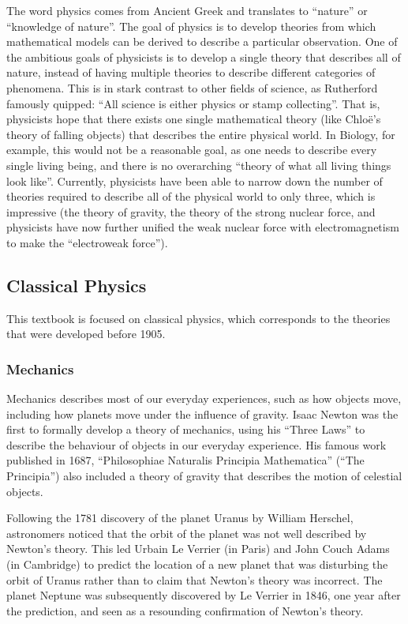 The word physics comes from Ancient Greek and translates to ``nature'' or ``knowledge of nature''. The goal of physics is to develop theories from which mathematical models can be derived to describe a particular observation. One of the ambitious goals of physicists is to develop a single theory that describes all of nature, instead of having multiple theories to describe different categories of phenomena. This is in stark contrast to other fields of science, as Rutherford famously quipped: ``All science is either physics or stamp collecting''. That is, physicists hope that there exists one single mathematical theory (like Chlo\"e's theory of falling objects) that describes the entire physical world. In Biology, for example, this would not be a reasonable goal, as one needs to describe every single living being, and there is no overarching ``theory of what all living things look like''. Currently, physicists have been able to narrow down the number of theories required to describe all of the physical world to only three, which is impressive (the theory of gravity, the theory of the strong nuclear force, and physicists have now further unified the weak nuclear force with electromagnetism to make the “electroweak force”).


\subsection{Classical Physics}
This textbook is focused on classical physics, which corresponds to the theories that were developed before 1905.
\subsubsection{Mechanics}
Mechanics describes most of our everyday experiences, such as how objects move, including how planets move under the influence of gravity. Isaac Newton was the first to formally develop a theory of mechanics, using his ``Three Laws'' to describe the behaviour of objects in our everyday experience. His famous work published in 1687, ``Philosophiae Naturalis Principia Mathematica'' (``The Principia'') also included a theory of gravity that describes the motion of celestial objects. 

Following the 1781 discovery of the planet Uranus by William Herschel, astronomers noticed that the orbit of the planet was not well described by Newton's theory. This led Urbain Le Verrier (in Paris) and John Couch Adams (in Cambridge) to predict the location of a new planet that was disturbing the orbit of Uranus rather than to claim that Newton's theory was incorrect. The planet Neptune was subsequently discovered by Le Verrier in 1846, one year after the prediction, and seen as a resounding confirmation of Newton's theory. 

